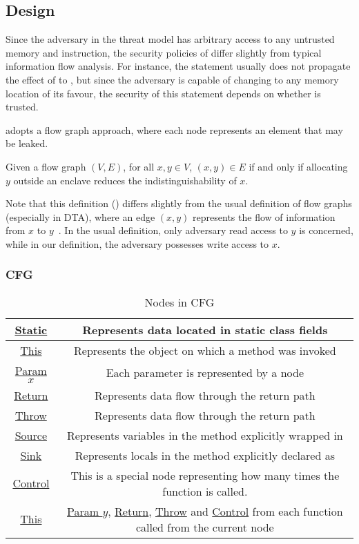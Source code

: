 \subsection{Design}\label{subsec:design}
Since the adversary in the threat model
has arbitrary access to any untrusted memory and instruction,
the security policies of \pname{} differ slightly from typical information flow analysis.
For instance, the statement  usually
does not propagate the effect of  to ,
but since the adversary is capable of changing  to any memory location of its favour,
the security of this statement depends on whether  is trusted.

\pname{} adopts a flow graph approach,
where each node represents an element that may be leaked.

\begin{defin}
	Given a flow graph $(V, E)$, for all $x, y \in V$,
	$(x, y) \in E$ if and only if
	allocating $y$ outside an enclave reduces the indistinguishability of $x$.
\end{defin}

Note that this definition () differs slightly from
the usual definition of flow graphs (especially in \ac{DTA}),
where an edge $(x, y)$ represents the flow of information from $x$ to $y$~\cite{YinHeng2007Pcsi}.
In the usual definition, only adversary read access to $y$ is concerned,
while in our definition, the adversary possesses write access to $x$.

\subsubsection{\acf{CFG}}
\begin{table}
	\caption{Nodes in \ac{CFG}}
	\centering
	\begin{tabular}{|c|c|}
		\hline
		\underline{Static} & Represents data located in static class fields \\ \hline
		\underline{This} & Represents the object on which a method was invoked \\ \hline
		\underline{Param} $x$ & Each parameter is represented by a node \\ \hline
		\underline{Return} & Represents data flow through the return path \\ \hline
		\underline{Throw} & Represents data flow through the return path \\ \hline
		\underline{Source} & Represents variables in the method explicitly wrapped in \code{sourceMarker} \\ \hline
		\underline{Sink} & Represents locals in the method explicitly declared as \code{sinkMarker} \\ \hline
		\underline{Control} & This is a special node representing how many times the function is called. \\ \hline
		\underline{This} & \underline{Param $y$}, \underline{Return}, \underline{Throw} and \underline{Control}
		from each function called from the current node \\ \hline
	\end{tabular}
	\label{tab:cfg-nodes}
\end{table}

